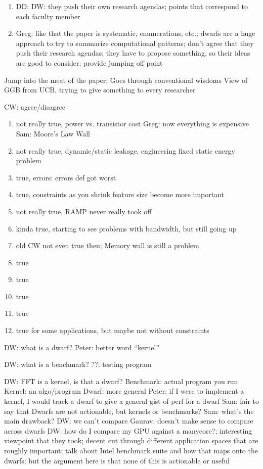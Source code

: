 \begin{enumerate}
    \item DD: %
        DW: they push their own research agendas; points that correspond to each faculty member
    \item Greg: like that the paper is systematic, enumerations, etc.; dwarfs are a huge approach to try to summarize computational patterns; don't agree that they push their research agendas; they have to propose something, so their ideas are good to consider; provide jumping off point
\end{enumerate}

Jump into the meat of the paper:
Goes through conventional wisdoms
View of GGB from UCB, trying to give something to every researcher

CW: agree/disagree
\begin{enumerate}
    \item not really true, power vs. transistor cost
    Greg: now everything is expensive
    Sam: Moore's Law Wall
    \item not really true, dynamic/static leakage, engineering fixed static energy problem
    \item true, errors: errors def got worst
    \item true, constraints as you shrink feature size become more important
    \item not really true, RAMP never really took off
    \item kinda true, starting to see problems with bandwidth, but still going up
    \item old CW not even true then; Memory wall is still a problem
    \item true
    \item true
    \item true
    \item true
    \item true for some applications, but maybe not without constraints
\end{enumerate}

DW: what is a dwarf?
Peter: better word ``kernel''

DW: what is a benchmark?
??: testing program

DW: FFT is a kernel, is that a dwarf?
Benchmark: actual program you run
Kernel: an algo/program
Dwarf: more general
Peter: if I were to implement a kernel, I would track a dwarf to give a general gist of perf for a dwarf
Sam: fair to say that Dwarfs are not actionable, but kernels or benchmarks?
Sam: what's the main drawback?
DW: we can't compare
Gaurav: doesn't make sense to compare across dwarfs
DW: how do I compare my GPU against a manycore?; interesting viewpoint that they took; decent cut through different application spaces that are roughly important; talk about Intel benchmark suite and how that maps onto the dwarfs; but the argument here is that none of this is actionable or useful

